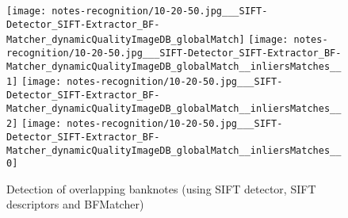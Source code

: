 \begin{figure}[H]
	\centering
	\texttt{[image: notes-recognition/10-20-50.jpg\_\_\_SIFT-Detector\_SIFT-Extractor\_BF-Matcher\_dynamicQualityImageDB\_globalMatch]}\hfill
	\texttt{[image: notes-recognition/10-20-50.jpg\_\_\_SIFT-Detector\_SIFT-Extractor\_BF-Matcher\_dynamicQualityImageDB\_globalMatch\_\_inliersMatches\_\_1]}\hfill
	\texttt{[image: notes-recognition/10-20-50.jpg\_\_\_SIFT-Detector\_SIFT-Extractor\_BF-Matcher\_dynamicQualityImageDB\_globalMatch\_\_inliersMatches\_\_2]}\hfill
	\texttt{[image: notes-recognition/10-20-50.jpg\_\_\_SIFT-Detector\_SIFT-Extractor\_BF-Matcher\_dynamicQualityImageDB\_globalMatch\_\_inliersMatches\_\_0]}
	\caption{Detection of overlapping banknotes (using SIFT detector, SIFT descriptors and BFMatcher)}
	\label{fig:recognition-overlapping-banknotes}
\end{figure}
